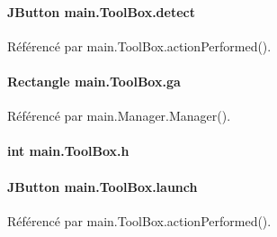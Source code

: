\paragraph[{detect}]{\setlength{\rightskip}{0pt plus 5cm}J\+Button main.\+Tool\+Box.\+detect\hspace{0.3cm}{\ttfamily [private]}}\label{classmain_1_1ToolBox_a62c86c165a3c33ca19837acd93844548}


Référencé par main.\+Tool\+Box.\+action\+Performed().

\hypertarget{classmain_1_1ToolBox_ab1c5162cc4718a5e4b51430dc6ea7d66}{}
\paragraph[{ga}]{\setlength{\rightskip}{0pt plus 5cm}Rectangle main.\+Tool\+Box.\+ga\hspace{0.3cm}{\ttfamily [static]}}\label{classmain_1_1ToolBox_ab1c5162cc4718a5e4b51430dc6ea7d66}


Référencé par main.\+Manager.\+Manager().

\hypertarget{classmain_1_1ToolBox_af21476c3890b8d1ebfa0c30c8e3636ea}{}
\paragraph[{h}]{\setlength{\rightskip}{0pt plus 5cm}int main.\+Tool\+Box.\+h\hspace{0.3cm}{\ttfamily [private]}}\label{classmain_1_1ToolBox_af21476c3890b8d1ebfa0c30c8e3636ea}
\hypertarget{classmain_1_1ToolBox_a7f10ce96929414e4aaf86dbdf772c572}{}
\paragraph[{launch}]{\setlength{\rightskip}{0pt plus 5cm}J\+Button main.\+Tool\+Box.\+launch\hspace{0.3cm}{\ttfamily [private]}}\label{classmain_1_1ToolBox_a7f10ce96929414e4aaf86dbdf772c572}


Référencé par main.\+Tool\+Box.\+action\+Performed().

\hypertarget{classmain_1_1ToolBox_a1ab2e723f8e1f783109242ccc1b811c1}{}
